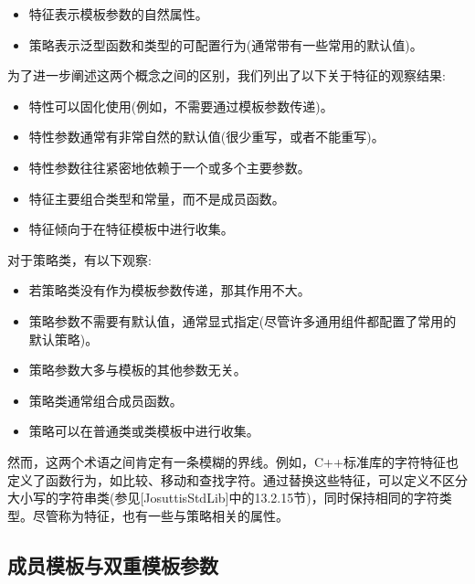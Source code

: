 \begin{itemize}
\item 
特征表示模板参数的自然属性。

\item 
策略表示泛型函数和类型的可配置行为(通常带有一些常用的默认值)。
\end{itemize}

为了进一步阐述这两个概念之间的区别，我们列出了以下关于特征的观察结果:

\begin{itemize}
\item 
特性可以固化使用(例如，不需要通过模板参数传递)。

\item 
特性参数通常有非常自然的默认值(很少重写，或者不能重写)。

\item 
特性参数往往紧密地依赖于一个或多个主要参数。

\item 
特征主要组合类型和常量，而不是成员函数。

\item 
特征倾向于在特征模板中进行收集。
\end{itemize}

对于策略类，有以下观察:

\begin{itemize}
\item 
若策略类没有作为模板参数传递，那其作用不大。

\item 
策略参数不需要有默认值，通常显式指定(尽管许多通用组件都配置了常用的默认策略)。

\item 
策略参数大多与模板的其他参数无关。

\item 
策略类通常组合成员函数。

\item 
策略可以在普通类或类模板中进行收集。
\end{itemize}

然而，这两个术语之间肯定有一条模糊的界线。例如，C++标准库的字符特征也定义了函数行为，如比较、移动和查找字符。通过替换这些特征，可以定义不区分大小写的字符串类(参见[JosuttisStdLib]中的13.2.15节)，同时保持相同的字符类型。尽管称为特征，也有一些与策略相关的属性。

\subsection{成员模板与双重模板参数}

